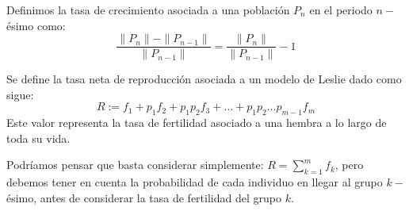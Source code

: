 \begin{definicion}
    Definimos la tasa de crecimiento asociada a una población $P_n$ en el periodo $n-$ésimo como:
    \begin{equation*}
        \frac{\|P_n\|-\|P_{n-1}\|}{\|P_{n-1}\|}
        = \frac{\|P_n\|}{\|P_{n-1}\|} -1
    \end{equation*}
\end{definicion}

\begin{definicion}
    Se define la tasa neta de reproducción asociada a un modelo de Leslie dado como sigue:
    \begin{equation*}
        R := f_1 + p_1f_2 + p_1p_2f_3 + \ldots + p_1p_2\ldots p_{m-1}f_m
    \end{equation*}
    Este valor representa la tasa de fertilidad asociado a una hembra a lo largo de toda su vida.
\end{definicion}
Podríamos pensar que basta considerar simplemente: $R = \sum\limits_{k=1}^m f_k$, pero debemos tener en cuenta la probabilidad de cada individuo en llegar al grupo $k-$ésimo, antes de considerar la tasa de fertilidad del grupo $k$.\\


